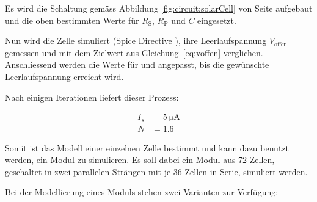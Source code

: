 Es wird die Schaltung gem\"ass Abbildung \ref{fig:circuit:solarCell} von Seite
\pageref{fig:circuit:solarCell} aufgebaut und die  oben bestimmten Werte f\"ur
$R_{\mathrm{S}}$, $R_{\mathrm{P}}$ und $C$ eingesetzt.



Nun  wird  die  Zelle  simuliert   (Spice  Directive  ),  ihre
Leerlaufspannung  $V_{\mathrm{offen}}$  gemessen  und  mit  dem  Zielwert  aus
Gleichung~\ref{eq:voffen}  verglichen.  Anschliessend  werden die  Werte f\"ur
  und    angepasst,  bis  die  gew\"unschte  Leerlaufspannung
erreicht wird.

Nach einigen Iterationen liefert dieser Prozess\footnotemark:


\begin{align}
    \label{eq:cell:diode:IS:N:result}
    I_s &= \SI{5}{\micro\ampere} \\
    N   &= 1.6
\end{align}

Somit ist  das Modell  einer einzelnen  Zelle bestimmt  und kann  dazu benutzt
werden,  ein Modul  zu  simulieren. Es soll  dabei ein  Modul  aus 72  Zellen,
geschaltet in zwei parallelen Str\"angen mit  je 36 Zellen in Serie, simuliert
werden.

\myfancybreak

Bei der Modellierung eines Moduls stehen zwei Varianten zur Verf\"ugung:


